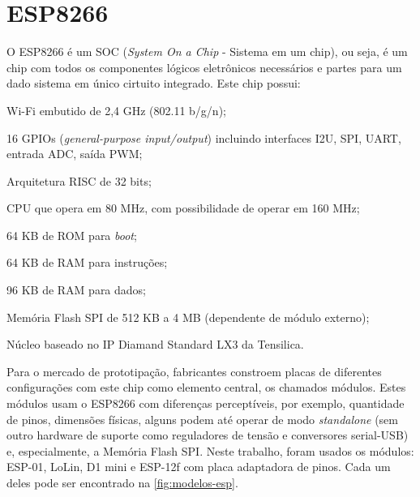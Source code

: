 \section{ESP8266}
\label{sec:ESP8266}

O ESP8266 é um SOC (\emph{System On a Chip} - Sistema em um chip),
ou seja, é um chip com todos os componentes lógicos
eletrônicos necessários e partes para um dado sistema em único cirtuito
integrado. Este chip possui:


\begin{alineas}
	\item Wi-Fi embutido de 2,4 GHz (802.11 b/g/n);

	\item 16 GPIOs (\emph{general-purpose input/output}) incluindo interfaces
 I2U, SPI, UART, entrada ADC, saída PWM;

	\item Arquitetura RISC de 32 bits;

	\item CPU que opera em  80 MHz, com possibilidade de operar em 160 MHz;

	\item 64 KB de ROM para \emph{boot};

	\item 64 KB de RAM para instruções;

	\item 96 KB de RAM para dados;

	\item Memória Flash SPI de 512 KB a 4 MB (dependente de módulo externo);

	\item Núcleo baseado no IP Diamand Standard LX3 da Tensilica.

\end{alineas}

Para o mercado de prototipação, fabricantes constroem placas de diferentes configurações com
este chip como elemento central, os chamados módulos. Estes módulos usam o
ESP8266 com diferenças perceptíveis, por exemplo, quantidade de pinos, dimensões
físicas, alguns podem até operar de modo \emph{standalone} (sem outro hardware de
suporte como reguladores de tensão e conversores serial-USB) e, especialmente, a
 Memória Flash SPI. Neste trabalho, foram usados os módulos:
ESP-01, LoLin, D1 mini e ESP-12f com placa adaptadora de pinos.
Cada um deles pode ser encontrado na \autoref{fig:modelos-esp}.


